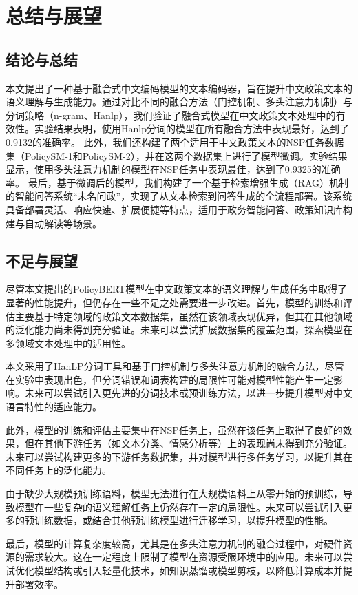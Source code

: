 \documentclass[12pt, a4paper]{ctexart}
\begin{document}
\section{总结与展望}
\subsection{结论与总结}
本文提出了一种基于融合式中文编码模型的文本编码器，旨在提升中文政策文本的语义理解与生成能力。通过对比不同的融合方法（门控机制、多头注意力机制）与分词策略（n-gram、Hanlp），我们验证了融合式模型在中文政策文本处理中的有效性。实验结果表明，使用Hanlp分词的模型在所有融合方法中表现最好，达到了0.9132的准确率。
此外，我们还构建了两个适用于中文政策文本的NSP任务数据集（PolicySM-1和PolicySM-2），并在这两个数据集上进行了模型微调。实验结果显示，使用多头注意力机制的模型在NSP任务中表现最佳，达到了0.9325的准确率。
最后，基于微调后的模型，我们构建了一个基于检索增强生成（RAG）机制的智能问答系统“未名问政”，实现了从文本检索到问答生成的全流程部署。该系统具备部署灵活、响应快速、扩展便捷等特点，适用于政务智能问答、政策知识库构建与自动解读等场景。

\subsection{不足与展望}
尽管本文提出的PolicyBERT模型在中文政策文本的语义理解与生成任务中取得了显著的性能提升，但仍存在一些不足之处需要进一步改进。首先，模型的训练和评估主要基于特定领域的政策文本数据集，虽然在该领域表现优异，但其在其他领域的泛化能力尚未得到充分验证。未来可以尝试扩展数据集的覆盖范围，探索模型在多领域文本处理中的适用性。

本文采用了HanLP分词工具和基于门控机制与多头注意力机制的融合方法，尽管在实验中表现出色，但分词错误和词表构建的局限性可能对模型性能产生一定影响。未来可以尝试引入更先进的分词技术或预训练方法，以进一步提升模型对中文语言特性的适应能力。

此外，模型的训练和评估主要集中在NSP任务上，虽然在该任务上取得了良好的效果，但在其他下游任务（如文本分类、情感分析等）上的表现尚未得到充分验证。未来可以尝试构建更多的下游任务数据集，并对模型进行多任务学习，以提升其在不同任务上的泛化能力。

由于缺少大规模预训练语料，模型无法进行在大规模语料上从零开始的预训练，导致模型在一些复杂的语义理解任务上仍然存在一定的局限性。未来可以尝试引入更多的预训练数据，或结合其他预训练模型进行迁移学习，以提升模型的性能。

最后，模型的计算复杂度较高，尤其是在多头注意力机制的融合过程中，对硬件资源的需求较大。这在一定程度上限制了模型在资源受限环境中的应用。未来可以尝试优化模型结构或引入轻量化技术，如知识蒸馏或模型剪枝，以降低计算成本并提升部署效率。
\end{document}
